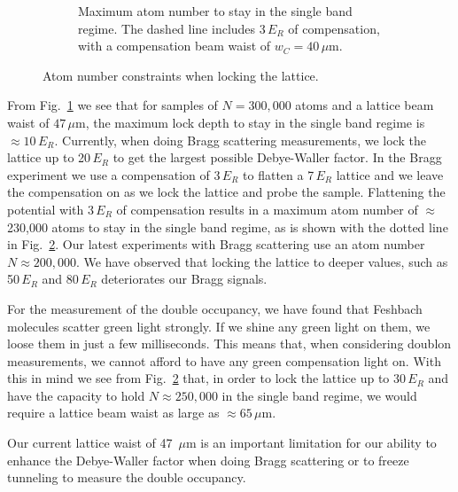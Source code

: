 \documentclass[11pt,letter]{article}
\begin{document}
\begin{figure}
\begin{subfigure}[t]{0.48\textwidth}
\caption{Maximum atom number to stay in the single band regime.  The dashed
line includes 3\,$E_{R}$ of compensation, with a compensation beam waist of
$w_{C}=40\,\mu$m.}
                \label{fig:lattice_lockB}
	\end{subfigure}%
	\caption{Atom number constraints when locking the
lattice.}\label{fig:lattice_lock}
\end{figure}

From Fig.~\ref{fig:lattice_lockB} we see that for samples of $N\!=\!300,000$
atoms and a lattice beam waist of $47\,\mu$m,  the maximum lock depth to stay
in the single band regime is $\approx 10\,E_{R}$.   Currently, when doing Bragg
scattering measurements, we lock the lattice up to 20\,$E_{R}$ to get the
largest possible Debye-Waller factor.   In the Bragg experiment we use a
compensation of 3\,$E_{R}$ to flatten a 7\,$E_{R}$ lattice and we leave the
compensation on as we lock the lattice and probe the sample.  Flattening the
potential with  $3\,E_{R}$ of compensation results in a maximum atom number of
$\approx$230,000 atoms to stay in the single band regime, as is shown with the
dotted line in Fig.~\ref{fig:lattice_lock}.  Our latest experiments with Bragg
scattering use an atom number $N\approx200,000$.  We have observed that locking
the lattice to deeper values, such as 50\,$E_{R}$ and 80\,$E_{R}$ deteriorates
our Bragg signals.


For the measurement of the double occupancy, we have found that Feshbach
molecules scatter green light strongly.  If we shine any green light on them,
we loose them in just a few milliseconds.  This means that, when considering
doublon measurements, we cannot afford to have any green compensation light on.  
With this in mind we see from Fig.~\ref{fig:lattice_lock} that, in order to
lock the lattice up to $30\,E_{R}$  and have the capacity to hold $N\approx
250,000$ in the single band regime, we would require a lattice beam waist as
large as $\approx 65\,\mu$m. 

Our current lattice waist of 47~$\mu$m is an important limitation for our
ability to enhance the Debye-Waller factor when doing Bragg scattering or to
freeze tunneling to measure the double occupancy. 
\end{document}
